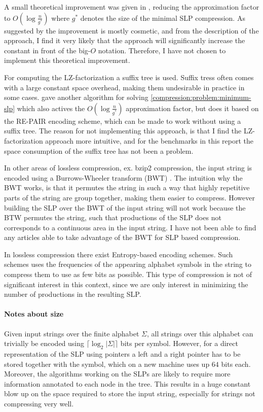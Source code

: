 \documentclass[twoside,11pt,openright]{report}
\newcommand{\ceil}[1] {\lceil #1 \rceil}
\begin{document}
A small theoretical improvement was given in \cite{Rytter2003211}, reducing the approximation factor to $O(\log{\frac{n}{g^*}})$ where $g^*$ denotes the size of the minimal SLP compression. As suggested by \cite{Rytter2003211} the improvement is mostly cosmetic, and from the description of the approach, I find it very likely that the approach will significantly increase the constant in front of the big-$O$ notation. Therefore, I have not chosen to implement this theoretical improvement.

For computing the LZ-factorization a suffix tree is used. Suffix tress often comes with a large constant space overhead, making them undesirable in practice in some cases. \cite{Sakamoto2005416} gave another algorithm for solving \cref{compression:problem:minimum-slp} which also actives the $O(\log{\frac{n}{g^*}})$ approximation factor, but does it based on the RE-PAIR encoding scheme, which can be made to work without using a suffix tree. The reason for not implementing this approach, is that I find the LZ-factorization approach more intuitive, and for the benchmarks in this report the space consumption of the suffix tree has not been a problem.

In other areas of lossless compression, ex. bzip2 compression, the input string is encoded using a Burrows-Wheeler transform (BWT) \cite{BurrowsWheeler}. The intuition why the BWT works, is that it permutes the string in such a way that highly repetitive parts of the string are group together, making them easier to compress. However building the SLP over the BWT of the input string will not work because the BTW permutes the string, such that productions of the SLP does not corresponds to a continuous area in the input string. I have not been able to find any articles able to take advantage of the BWT for SLP based compression.

In lossless compression there exist Entropy-based encoding schemes. Such schemes uses the frequencies of the appearing alphabet symbols in the string to compress them to use as few bits as possible. This type of compression is not of significant interest in this context, since we are only interest in minimizing the number of productions in the resulting SLP.

\paragraph{Notes about size}
Given input strings over the finite alphabet $\Sigma$, all strings over this alphabet can trivially be encoded using $\ceil{\log_2 |\Sigma|}$ bits per symbol. However, for a direct representation of the SLP using pointers a left and a right pointer has to be stored together with the symbol, which on a new machine uses up $64$ bits each. Moreover, the algorithms working on the SLPs are likely to require more information annotated to each node in the tree. This results in a huge constant blow up on the space required to store the input string, especially for strings not compressing very well.
\end{document}
